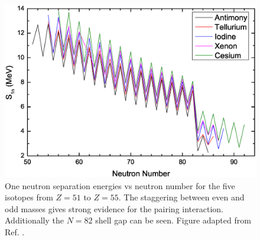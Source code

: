 \begin{figure}[t!]
\centerline{\includegraphics[height=0.3\textheight]{./img/c2/S1n_MassChains.eps}}
	\caption{One neutron separation energies vs neutron number for the five isotopes from $Z=51$ to $Z=55$. The staggering between even and odd masses gives strong evidence for the pairing interaction. Additionally the $N=82$ shell gap can be seen. Figure adapted from Ref. \cite{nilssonDiagrams}.\label{fig:chp2-s1n-staggering}}
\end{figure}

